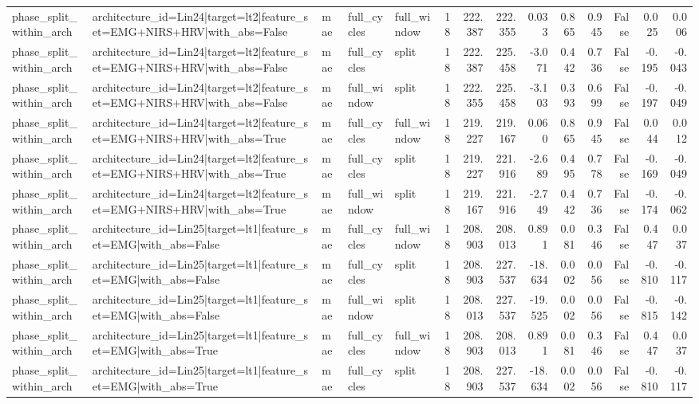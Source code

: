 \begin{table}
\begin{tabular}{lllllrrrrrrrrr}
phase_split_within_arch & architecture_id=Lin24|target=lt2|feature_set=EMG+NIRS+HRV|with_abs=False & mae & full_cycles & full_window & 18 & 222.387 & 222.355 & 0.033 & 0.865 & 0.945 & False & 0.025 & 0.006 \\
phase_split_within_arch & architecture_id=Lin24|target=lt2|feature_set=EMG+NIRS+HRV|with_abs=False & mae & full_cycles & split & 18 & 222.387 & 225.458 & -3.071 & 0.442 & 0.736 & False & -0.195 & -0.043 \\
phase_split_within_arch & architecture_id=Lin24|target=lt2|feature_set=EMG+NIRS+HRV|with_abs=False & mae & full_window & split & 18 & 222.355 & 225.458 & -3.103 & 0.393 & 0.699 & False & -0.197 & -0.049 \\
phase_split_within_arch & architecture_id=Lin24|target=lt2|feature_set=EMG+NIRS+HRV|with_abs=True & mae & full_cycles & full_window & 18 & 219.227 & 219.167 & 0.060 & 0.865 & 0.945 & False & 0.044 & 0.012 \\
phase_split_within_arch & architecture_id=Lin24|target=lt2|feature_set=EMG+NIRS+HRV|with_abs=True & mae & full_cycles & split & 18 & 219.227 & 221.916 & -2.689 & 0.495 & 0.778 & False & -0.169 & -0.049 \\
phase_split_within_arch & architecture_id=Lin24|target=lt2|feature_set=EMG+NIRS+HRV|with_abs=True & mae & full_window & split & 18 & 219.167 & 221.916 & -2.749 & 0.442 & 0.736 & False & -0.174 & -0.062 \\
phase_split_within_arch & architecture_id=Lin25|target=lt1|feature_set=EMG|with_abs=False & mae & full_cycles & full_window & 18 & 208.903 & 208.013 & 0.891 & 0.081 & 0.346 & False & 0.447 & 0.037 \\
phase_split_within_arch & architecture_id=Lin25|target=lt1|feature_set=EMG|with_abs=False & mae & full_cycles & split & 18 & 208.903 & 227.537 & -18.634 & 0.002 & 0.056 & False & -0.810 & -0.117 \\
phase_split_within_arch & architecture_id=Lin25|target=lt1|feature_set=EMG|with_abs=False & mae & full_window & split & 18 & 208.013 & 227.537 & -19.525 & 0.002 & 0.056 & False & -0.815 & -0.142 \\
phase_split_within_arch & architecture_id=Lin25|target=lt1|feature_set=EMG|with_abs=True & mae & full_cycles & full_window & 18 & 208.903 & 208.013 & 0.891 & 0.081 & 0.346 & False & 0.447 & 0.037 \\
phase_split_within_arch & architecture_id=Lin25|target=lt1|feature_set=EMG|with_abs=True & mae & full_cycles & split & 18 & 208.903 & 227.537 & -18.634 & 0.002 & 0.056 & False & -0.810 & -0.117 \\

\end{tabular}
\end{table}
